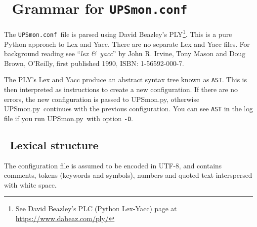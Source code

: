 \documentclass[12pt]{article}
\newlength{\headersep}\setlength{\headersep}{3mm}
\newcommand{\Hsep}{\hspace{\headersep}}
\newcommand{\newcolumn}{\vfill\eject}
\newcommand{\UPSmon}{\mbox{\textcolor{UPSMONCOLOUR}{UPSmon.py}}}
\newcommand{\UPSmonconf}{\textcolor{UPSMONCOLOUR}{\texttt{UPSmon.conf}}}
\newcommand{\PLY}{David Beazley's PLY\footnote{See David Beazley's PLC (Python Lex-Yacc) page at
                  \href{https://www.dabeaz.com/ply/}%
                       {https://{\allowbreak}www.dabeaz.com/{\allowbreak}ply/}}}
\begin{document}
\vspace*{\fill}

\begin{center}
\end{center}

\vspace*{\fill}


%


\newcolumn
\section{\Hsep\ Grammar for \UPSmonconf}\label{section:grammar}

The \UPSmonconf\ file is parsed using \PLY. This is a pure Python approach to
Lex and Yacc.  There are no separate Lex and Yacc files.  For background
reading see ``\textit{lex \&\ yacc}'' by John R. Irvine, Tony Mason and Doug
Brown, O'Reilly, first published 1990, ISBN: 1-56592-000-7.

The PLY's Lex and Yacc produce an abstract syntax tree known as \texttt{AST}.
This is then interpreted as instructions to create a new configuration.  If
there are no errors, the new configuration is passed to \UPSmon, otherwise
\UPSmon\ continues with the previous configuration.  You can see \texttt{AST}
in the log file if you run \UPSmon\ with option \texttt{-D}.

\subsection{\Hsep\ Lexical structure}\label{section:lexstruct}

The configuration file is assumed to be encoded in UTF-8, and contains
comments, tokens (keywords and symbols), numbers and quoted text interspersed
with white space.
\end{document}
